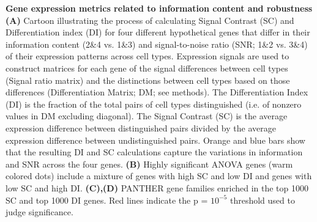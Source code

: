 \textbf{Gene expression metrics related to information content and robustness} \textbf{(A)} Cartoon illustrating the process of calculating Signal Contrast (SC) and Differentiation index (DI) for four different hypothetical genes that differ in their information content (2\&4 vs. 1\&3) and signal-to-noise ratio (SNR; 1\&2 vs. 3\&4) of their expression patterns across cell types. Expression signals are used to construct matrices for each gene of the signal differences between cell types (Signal ratio matrix) and the distinctions between cell types based on those differences (Differentiation Matrix; DM; see methods). The Differentiation Index (DI) is the fraction of the total pairs of cell types distinguished (i.e. of nonzero values in DM excluding diagonal). The Signal Contrast (SC) is the average expression difference between distinguished pairs divided by the average expression difference between undistinguished pairs. Orange and blue bars show that the resulting DI and SC calculations capture the variations in information and SNR across the four genes. \textbf{(B)} Highly significant ANOVA genes (warm colored dots) include a mixture of genes with high SC and low DI and genes with low SC and high DI. \textbf{(C),(D)} PANTHER gene families enriched in the top 1000 SC and top 1000 DI genes. Red lines indicate the p = $10^{-5}$ threshold used to judge significance.